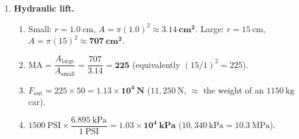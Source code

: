 \documentclass[12pt, twoside]{article}
\begin{document}
\begin{enumerate}[itemsep=0.4cm]
\item \textbf{Hydraulic lift.}
  \begin{enumerate}[itemsep=0.25cm]
    \item Small: $r=1.0~\text{cm}$, $A=\pi(1.0)^2\approx\mathbf{3.14~\text{cm}^2}$. \;
          Large: $r=15~\text{cm}$, $A=\pi(15)^2\approx\mathbf{707~\text{cm}^2}$.
    \item $\text{MA}=\dfrac{A_\text{large}}{A_\text{small}}=\dfrac{707}{3.14}=\mathbf{225}$ (equivalently $(15/1)^2=225$).
    \item $F_\text{out}=225\times50=\mathbf{1.13\times10^4~\text{N}}$ ($11{,}250~\text{N}$, $\approx$ the weight of an $1150~\text{kg}$ car).
    \item $1500~\text{PSI}\times\dfrac{6.895~\text{kPa}}{1~\text{PSI}}=\mathbf{1.03\times10^4~\text{kPa}}$ ($10{,}340~\text{kPa}=10.3~\text{MPa}$).
  \end{enumerate}

\end{enumerate}
\end{document}
